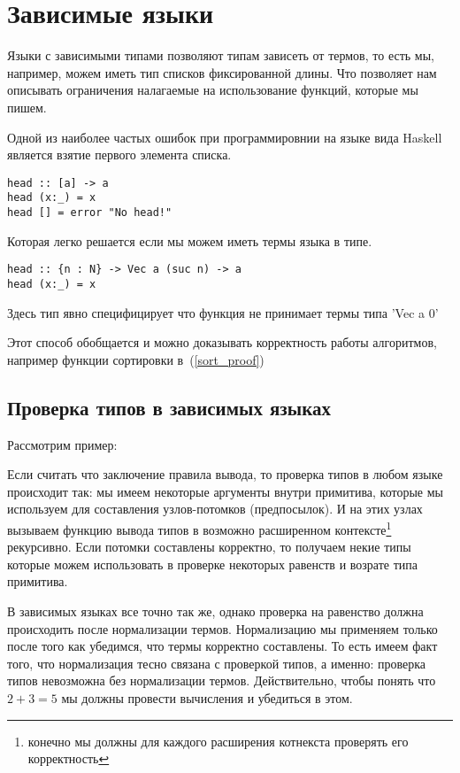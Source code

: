 \section{Зависимые языки} \label{deptypes_intro}
Языки с зависимыми типами позволяют типам зависеть от термов, то есть мы, например, можем иметь тип списков фиксированной длины. Что позволяет нам описывать ограничения налагаемые на использование функций, которые мы пишем.

Одной из наиболее частых ошибок при программировнии на языке вида Haskell является взятие первого элемента списка.
\begin{lstlisting}
head :: [a] -> a
head (x:_) = x
head [] = error "No head!"
\end{lstlisting}

Которая легко решается если мы можем иметь термы языка в типе.
\begin{lstlisting}
head :: {n : N} -> Vec a (suc n) -> a
head (x:_) = x
\end{lstlisting}
Здесь тип явно специфицирует что функция не принимает термы типа 'Vec a 0'

Этот способ обобщается и можно доказывать корректность работы алгоритмов, например функции сортировки в~(\ref{sort_proof})

\subsection{Проверка типов в зависимых языках}
Рассмотрим пример:

Если считать что заключение правила вывода, то проверка типов в любом языке происходит так: мы имеем некоторые аргументы внутри примитива, которые мы используем для составления узлов-потомков (предпосылок). И на этих узлах вызываем функцию вывода типов в возможно расширенном контексте\footnote{конечно мы должны для каждого расширения котнекста проверять его корректность} рекурсивно. Если потомки составлены корректно, то получаем некие типы которые можем использовать в проверке некоторых равенств и возрате типа примитива.

В зависимых языках все точно так же, однако проверка на равенство должна происходить после нормализации термов. Нормализацию мы применяем только после того как убедимся, что термы корректно составлены. То есть имеем факт того, что нормализация тесно связана с проверкой типов, а именно: проверка типов невозможна без нормализации термов. Действительно, чтобы понять что $2 + 3 = 5$ мы должны провести вычисления и убедиться в этом.







